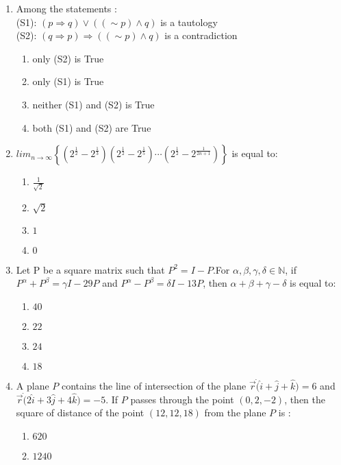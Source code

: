 \documentclass[journal,12pt,onecolumn]{IEEEtran}
\theoremstyle{remark}
\begin{document}
\begin{enumerate}
\item Among the statements : \\      
        (S1): $(p \Rightarrow q) \vee ((\sim p)\wedge q)$ is a tautology\\
        (S2): $(q \Rightarrow p) \Rightarrow ((\sim p)\wedge q)$ is a contradiction
    \begin{enumerate}
        \item only (S2) is True
        \item only (S1) is True
        \item neither (S1) and (S2) is True
        \item both (S1) and (S2) are True
    \end{enumerate}
    \item $lim_{n \to \infty} \left\{ \left( 2^{\frac{1}{2}} -2^{\frac{1}{3}} \right) \left( 2^{\frac{1}{2}} - 2^{\frac{1}{5}} \right) \cdots \left( 2^{\frac{1}{2}} - 2^{\frac{1}{2n+1}} \right) \right\}$ is equal to:
    \begin{enumerate}
        \item $\frac{1}{\sqrt{2}}$
        \item $\sqrt{2}$
        \item $1$
        \item $0$
    \end{enumerate}
    \item Let P be a square matrix such that $P^2 = I-P$.For $\alpha , \beta, \gamma, \delta \in \mathbb{N}$, if  $P^{\alpha}+P^{\beta}=\gamma I-29 P$ and $P^{\alpha}-P^{\beta}=\delta I-13P$, then $\alpha +\beta+ \gamma-\delta$ is equal to: \begin{enumerate}
        \item $40$    
 \item $22$    
        \item $24$     
        \item $18$     
    \end{enumerate}    
   \item A plane $P$ contains the line of intersection of the plane $ \overrightarrow{r} \dot (\hat{i} + \hat{j} + \hat{k}) = 6$ and $\overrightarrow{r} \dot (2\hat{i} + 3\hat{j} + 4\hat{k}) = -5 $. If  $P$ passes through the point  $(0, 2, -2)$, then the square of distance of the point $(12, 12, 18)$ from the plane $P$ is :
\begin{enumerate}
        \item $620$                   
        \item $1240$          

\end{enumerate}
\end{enumerate}
\end{document}
